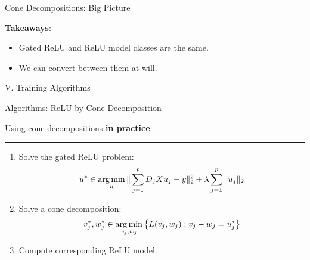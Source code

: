 \documentclass[usenames,dvipsnames,mathserif,notheorems]{beamer}
\newcommand{\horizontalrule}{
	{
			\vspace{-0.5em}
			\center \rule{\textwidth}{0.1em}
			\vspace{-0.2em}
		}
}
\begin{document}
\begin{frame}{Cone Decompositions: Big Picture}
	\begin{figure}[]
		\centering
		
	\end{figure}
	\pause

	\textbf{Takeaways}:

	\vspace{0.5em}
	\begin{itemize}
		\item Gated ReLU and ReLU model classes are the same.
		\item We can convert between them at will.
	\end{itemize}
\end{frame}



\begin{frame}{}
	\begin{center}
		\huge V. Training Algorithms
	\end{center}
\end{frame}

\begin{frame}{Algorithms: ReLU by Cone Decomposition}
	\begin{center}
		\large Using cone decompositions \textbf{in practice}.
	\end{center}

	\pause
	\horizontalrule

	\begin{enumerate}
		\item Solve the gated ReLU problem:
		      \[
			      u^* \in \mathop{\rm arg\,min}_{u} \|\sum_{j=1}^p D_j X u_j - y\|_2^2 + \lambda \sum_{j=1}^p \|u_j\|_2
		      \]
		      \pause
		\item Solve a cone decomposition:
		      \[
			      v_j^*, w_j^* \in \mathop{\rm arg\,min}_{v_j, w_j} \left\{ L(v_j, w_j) : v_j - w_j = u^*_j\right\}
		      \]
		      \pause

		\item Compute corresponding ReLU model.
	\end{enumerate}

\end{frame}
\end{document}
